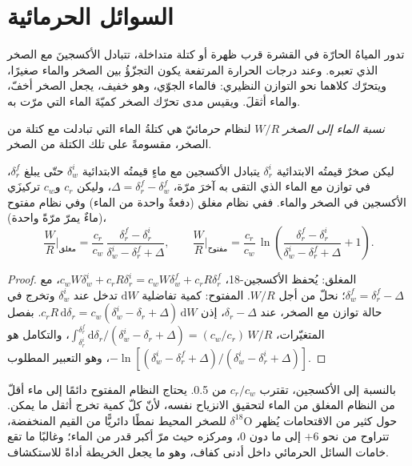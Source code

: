 \section{السوائل الحرمائية}\label{sec:b3:water-rock-interaction:hydrothermal}

تدور المياهُ الحارّة في القشرة قرب ظهرة أو كتلة متداخلة،
تتبادل الأكسجينَ مع الصخر الذي تعبره. وعند درجات الحرارة المرتفعة يكون
التجزّؤُ بين الصخر والماء صغيرًا، ويتحرّك كلاهما نحو
التوازن النظيري: فالماء الجوّي، وهو خفيف، يجعل الصخر أخفّ، والماء
أثقلَ. ويقيس مدى تحرّك الصخر كميّةَ الماء التي
مرّت به.

\begin{definition}\label{def:b3:water-rock-interaction:water-rock-ratio}
\emph{نسبة الماء إلى الصخر} $W/R$ لنظام حرمائيّ
هي كتلةُ الماء التي تبادلت مع كتلة من الصخر،
مقسومةً على تلك الكتلة من الصخر.
\end{definition}

\begin{proposition}\label{prop:b3:water-rock-interaction:wr}
ليكن صخرٌ قيمتُه الابتدائية $\delta_r^i$ يتبادل الأكسجين مع ماءٍ قيمتُه الابتدائية
$\delta_w^i$ حتّى يبلغ $\delta_r^f$، في توازن مع الماء
الذي التقى به آخرَ مرّة، $\Delta = \delta_r^f - \delta_w^f$، وليكن $c_r$ و$c_w$
تركيزَي الأكسجين في الصخر والماء. ففي نظام مغلق (دفعةٌ
واحدة من الماء) وفي نظام مفتوح (ماءٌ يمرّ مرّةً واحدة)،
\[
\frac WR\Big|_{\text{مغلق}} = \frac{c_r}{c_w}\,
\frac{\delta_r^f - \delta_r^i}{\delta_w^i - \delta_r^f + \Delta},
\qquad
\frac WR\Big|_{\text{مفتوح}} = \frac{c_r}{c_w}\,
\ln\!\left(\frac{\delta_r^f - \delta_r^i}{\delta_w^i - \delta_r^f + \Delta} + 1\right).
\]
\end{proposition}

\begin{proof}
المغلق: يُحفظ الأكسجين-18، $c_wW\delta_w^i + c_rR\delta_r^i = c_wW
\delta_w^f + c_rR\delta_r^f$، مع $\delta_w^f = \delta_r^f - \Delta$؛ نحلّ
من أجل $W/R$. المفتوح: كمية تفاضلية $\mathrm dW$ تدخل عند $\delta_w^i$ وتخرج في
حالة توازن مع الصخر، عند $\delta_r - \Delta$، إذن $c_rR\,\mathrm d\delta_r
= c_w(\delta_w^i - \delta_r + \Delta)\,\mathrm dW$. بفصل المتغيّرات،
$\int_{\delta_r^i}^{\delta_r^f}\mathrm d\delta_r/(\delta_w^i - \delta_r +
\Delta) = (c_w/c_r)\,W/R$، والتكامل هو $-\ln[(\delta_w^i - \delta_r^f
+ \Delta)/(\delta_w^i - \delta_r^i + \Delta)]$، وهو التعبير المطلوب.
\end{proof}

بالنسبة إلى الأكسجين، تقترب $c_r/c_w$ من 0.5. يحتاج النظام المفتوح دائمًا إلى ماء أقلّ من النظام المغلق
من الماء لتحقيق الانزياح نفسه، لأنّ كلّ كمية تخرج
أثقل ما يمكن. حول كثير من الاقتحامات يُظهر $\delta^{18}\mathrm O$ للصخر المحيط
نمطًا دائريًّا من القيم المنخفضة، تتراوح من نحو $+6$ إلى ما دون
0، ومركزه حيث مرّ أكبر قدر من الماء؛ وغالبًا ما تقع خامات السائل الحرمائي
داخل أدنى كفاف، وهو ما يجعل الخريطة أداةً
للاستكشاف.


